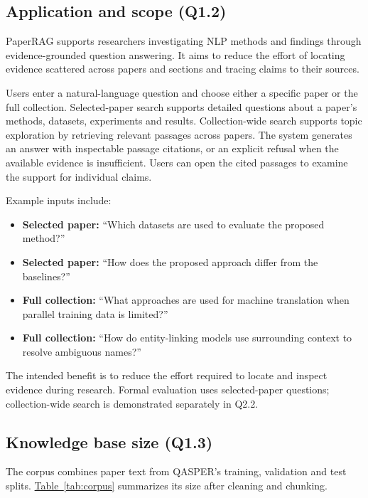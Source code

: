 \subsection{Application and scope (Q1.2)}
PaperRAG supports researchers investigating NLP methods and findings through evidence-grounded question answering. It aims to reduce the effort of locating evidence scattered across papers and sections and tracing claims to their sources.

Users enter a natural-language question and choose either a specific paper or the full collection. Selected-paper search supports detailed questions about a paper's methods, datasets, experiments and results. Collection-wide search supports topic exploration by retrieving relevant passages across papers. The system generates an answer with inspectable passage citations, or an explicit refusal when the available evidence is insufficient. Users can open the cited passages to examine the support for individual claims.

Example inputs include:
\begin{itemize}
\item[$\bullet$] \textbf{Selected paper:} ``Which datasets are used to evaluate the proposed method?''
\item[$\bullet$] \textbf{Selected paper:} ``How does the proposed approach differ from the baselines?''
\item[$\bullet$] \textbf{Full collection:} ``What approaches are used for machine translation when parallel training data is limited?''
\item[$\bullet$] \textbf{Full collection:} ``How do entity-linking models use surrounding context to resolve ambiguous names?''
\end{itemize}

The intended benefit is to reduce the effort required to locate and inspect evidence during research. Formal evaluation uses selected-paper questions; collection-wide search is demonstrated separately in Q2.2.


\subsection{Knowledge base size (Q1.3)}
The corpus combines paper text from QASPER's training, validation and test splits. \hyperref[tab:corpus]{Table~\ref*{tab:corpus}} summarizes its size after cleaning and chunking.

